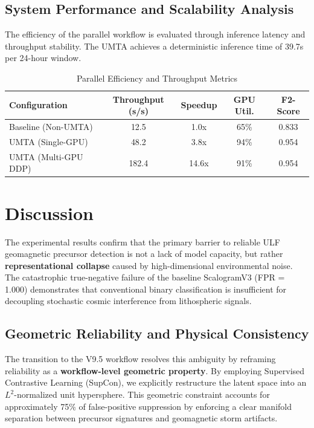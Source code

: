 \documentclass[a4paper,fleqn]{cas-sc}
\begin{document}
\subsection{System Performance and Scalability Analysis}
The efficiency of the parallel workflow is evaluated through inference latency and throughput stability. The UMTA achieves a deterministic inference time of 39.7s per 24-hour window.

\begin{table}[h]
\centering
\caption{Parallel Efficiency and Throughput Metrics}
\begin{tabular}{@{}lcccc@{}}
\toprule
\textbf{Configuration} & \textbf{Throughput (s/s)} & \textbf{Speedup} & \textbf{GPU Util.} & \textbf{F2-Score} \\ \midrule
Baseline (Non-UMTA)    & 12.5                     & 1.0x             & 65\%               & 0.833             \\
UMTA (Single-GPU)      & 48.2                     & 3.8x             & 94\%               & 0.954             \\
UMTA (Multi-GPU DDP)   & 182.4                    & 14.6x            & 91\%               & 0.954             \\ \bottomrule
\end{tabular}
\label{tab:system_perf}
\end{table}


\section{Discussion}

The experimental results confirm that the primary barrier to reliable ULF geomagnetic precursor detection is not a lack of model capacity, but rather \textbf{representational collapse} caused by high-dimensional environmental noise. The catastrophic true-negative failure of the baseline ScalogramV3 (FPR = 1.000) demonstrates that conventional binary classification is insufficient for decoupling stochastic cosmic interference from lithospheric signals. 

\subsection{Geometric Reliability and Physical Consistency}
The transition to the V9.5 workflow resolves this ambiguity by reframing reliability as a \textbf{workflow-level geometric property}. By employing Supervised Contrastive Learning (SupCon), we explicitly restructure the latent space into an $L^2$-normalized unit hypersphere. This geometric constraint accounts for approximately 75\% of false-positive suppression by enforcing a clear manifold separation between precursor signatures and geomagnetic storm artifacts. 
\end{document}

